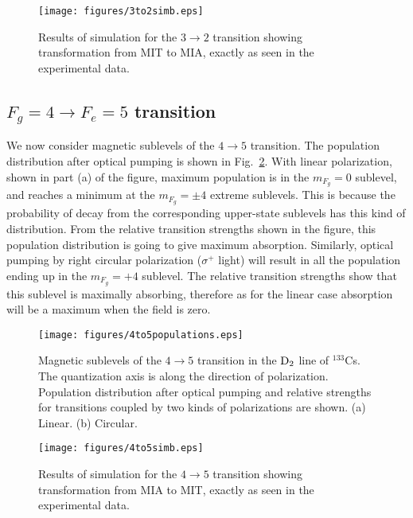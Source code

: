 \begin{figure}
	\centering
	\texttt{[image: figures/3to2simb.eps]}
	\caption{Results of simulation for the $ 3 \rightarrow 2 $ transition showing transformation from MIT to MIA, exactly as seen in the experimental data.}
	\label{fig:3to2sim}
\end{figure}

\subsection{$ F_g = 4 \rightarrow F_e = 5 $ \rm {transition}}
We now consider magnetic sublevels of the $ 4 \rightarrow 5$ transition. The population distribution after optical pumping is shown in Fig.\ \ref{fig:4to5populations}. With linear polarization, shown in part (a) of the figure, maximum population is in the $ m_{F_g} = 0 $ sublevel, and reaches a minimum at the $ m_{F_g} = \pm 4 $ extreme sublevels. This is because the probability of decay from the corresponding upper-state sublevels has this kind of distribution. From the relative transition strengths shown in the figure, this population distribution is going to give maximum absorption. Similarly, optical pumping by right circular polarization ($ \sigma^+ $ light) will result in all the population ending up in the $ m_{F_g} = +4 $ sublevel. The relative transition strengths show that this sublevel is maximally absorbing, therefore as for the linear case absorption will be a maximum when the field is zero.

\begin{figure}
	\centering
	\texttt{[image: figures/4to5populations.eps]}
	\caption{Magnetic sublevels of the $ 4 \rightarrow 5 $ transition in the $\rm D_2 $ line of $^{133}$Cs. The quantization axis is along the direction of polarization. Population distribution after optical pumping and relative strengths for transitions coupled by two kinds of polarizations are shown. (a) Linear. (b) Circular.}
	\label{fig:4to5populations}
\end{figure}

\begin{figure}[h]
	\centering
	\texttt{[image: figures/4to5simb.eps]}
	\caption{Results of simulation for the $ 4 \rightarrow 5 $ transition showing transformation from MIA to MIT, exactly as seen in the experimental data.}
	\label{fig:4to5sim}
\end{figure}


